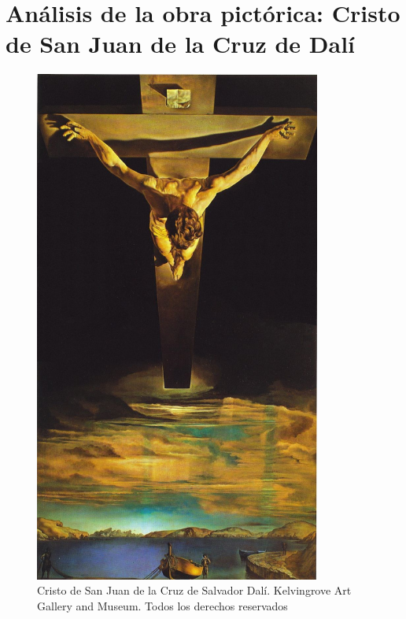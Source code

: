 \section{Análisis de la obra pictórica: Cristo de San Juan de la Cruz de Dalí}

\begin{figure}[ht!]
    \centering
    \includegraphics[width=0.84\textwidth]{dali.jpg}
    \caption{Cristo de San Juan de la Cruz de Salvador Dalí. Kelvingrove Art Gallery and Museum. Todos los derechos reservados} %
\end{figure}

\newpage


